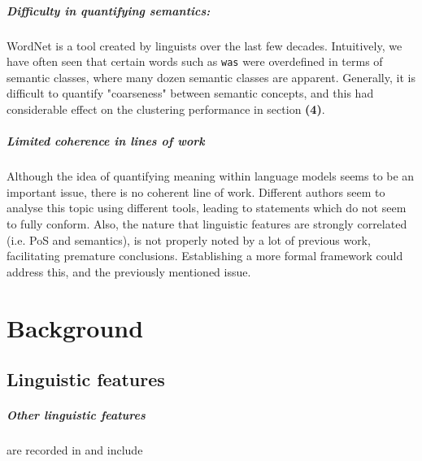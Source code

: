 \documentclass[a4paper,12pt,twoside,openright]{report}
\begin{document}
\paragraph{Difficulty in quantifying semantics:} WordNet is a tool created by linguists over the last few decades.
Intuitively, we have often seen that certain words such as \texttt{was} were overdefined in terms of semantic classes, where many dozen semantic classes are apparent.
Generally, it is difficult to quantify "coarseness" between semantic concepts, and this had considerable effect on the clustering performance in section \textbf{(4)}.

\paragraph{Limited coherence in lines of work} Although the idea of quantifying meaning within language models seems to be an important issue, there is no coherent line of work.
Different authors seem to analyse this topic using different tools, leading to statements which do not seem to fully conform.
Also, the nature that linguistic features are strongly correlated (i.e. PoS and semantics), is not properly noted by a lot of previous work, facilitating premature conclusions.
Establishing a more formal framework could address this, and the previously mentioned issue.


\appendix
\singlespacing

%  

 

\chapter{Background}

\section{Linguistic features}\label{appendix:linguistic_features}

\paragraph{Other linguistic features} are recorded in \cite{wang19} and include
\end{document}
